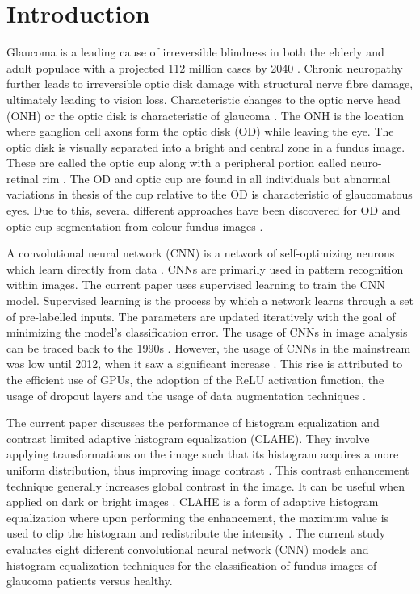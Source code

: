\documentclass{article}
\begin{document}
\section{Introduction}
Glaucoma is a leading cause of irreversible blindness in both the elderly and adult populace with a projected 112 million cases by 2040 \cite{b1}. Chronic neuropathy further leads to irreversible optic disk damage with structural nerve fibre damage, ultimately leading to vision loss. Characteristic changes to the optic nerve head (ONH) or the optic disk is characteristic of glaucoma \cite{b2}. The ONH is the location where ganglion cell axons form the optic disk (OD) while leaving the eye. The optic disk is visually separated into a bright and central zone in a fundus image. These are called the optic cup along with a peripheral portion called neuro-retinal rim \cite{b3}. The OD and optic cup are found in all individuals but abnormal variations in thesis of the cup relative to the OD is characteristic of glaucomatous eyes. Due to this, several different approaches have been discovered for OD and optic cup segmentation from colour fundus images \cite{b4, b5}.

A convolutional neural network (CNN) is a network of self-optimizing neurons which learn directly from data \cite{b6}.  CNNs are primarily used in pattern recognition within images. The current paper uses supervised learning to train the CNN model. Supervised learning is the process by which a network learns through a set of pre-labelled inputs. The parameters are updated iteratively with the goal of minimizing the model’s classification error. The usage of CNNs in image analysis can be traced back to the 1990s \cite{b7, b8}. However, the usage of CNNs in the mainstream was low until 2012, when it saw a significant increase \cite{b9}.  This rise is attributed to the efficient use of GPUs, the adoption of the ReLU activation function, the usage of dropout layers and the usage of data augmentation techniques \cite{b10, b11}. 

The current paper discusses the performance of histogram equalization and contrast limited adaptive histogram equalization (CLAHE). They involve applying transformations on the image such that its histogram acquires a more uniform distribution, thus improving image contrast \cite{b12}. This contrast enhancement technique generally increases global contrast in the image. It can be useful when applied on dark or bright images \cite{b13}. CLAHE is a form of adaptive histogram equalization where upon performing the enhancement, the maximum value is used to clip the histogram and redistribute the intensity \cite{b14}. The current study evaluates eight different convolutional neural network (CNN) models and histogram equalization techniques for the classification of fundus images of glaucoma patients versus healthy.
\end{document}
